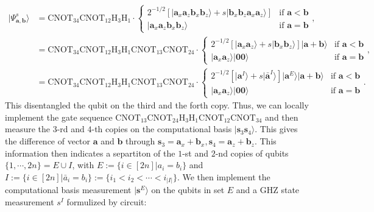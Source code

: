 \documentclass[aps,%
twocolumn,%
floatfix,%
pra,%
amsfonts,%
groupedaddress,%
superscriptaddress]{revtex4-2}%
\newcommand{\ket}[1]{\lvert #1\rangle}
\newcommand{\1}{\mathbbm{1}}
\begin{document}
\begin{align}
    \ket{\Psi^{s}_{\mathbf{a}, \mathbf{b}}}&= \mathrm{CNOT}_{34}\mathrm{CNOT}_{12}\mathrm{H}_3\mathrm{H}_1 \cdot
\begin{cases}
    2^{-1/2} \left[{\ket{\mathbf{a}_x \mathbf{a}_z\mathbf{b}_x\mathbf{b}_z} +s \ket{\mathbf{b}_x \mathbf{b}_z\mathbf{a}_x\mathbf{a}_z}}\right] &\text{if~} \mathbf{a} < \mathbf{b}\\
    \ket{\mathbf{a}_x \mathbf{a}_z\mathbf{b}_x\mathbf{b}_z}&\text{if~} \mathbf{a} = \mathbf{b}
\end{cases},\\
&= \mathrm{CNOT}_{34}\mathrm{CNOT}_{12}\mathrm{H}_3\mathrm{H}_1 \mathrm{CNOT}_{13}\mathrm{CNOT}_{24}\cdot
\begin{cases}
    2^{-1/2} \left[{\ket{\mathbf{a}_x \mathbf{a}_z} +s \ket{\mathbf{b}_x \mathbf{b}_z}} \right]\ket{\mathbf{a} + \mathbf{b}} &\text{if~} \mathbf{a} < \mathbf{b}\\
    \ket{\mathbf{a}_x \mathbf{a}_z} \ket{\mathbf{0} \mathbf{0}}&\text{if~} \mathbf{a} = \mathbf{b}
\end{cases},\\
&= \mathrm{CNOT}_{34}\mathrm{CNOT}_{12}\mathrm{H}_3\mathrm{H}_1 \mathrm{CNOT}_{13}\mathrm{CNOT}_{24}\cdot
\begin{cases}
    2^{-1/2} \left[{\ket{\mathbf{a}^{I}} +s \ket{\bar{\mathbf{a}}^{I}}}\right] \ket{\mathbf{a}^{E}}\ket{\mathbf{a} + \mathbf{b}} &\text{if~} \mathbf{a} < \mathbf{b}\\
    \ket{\mathbf{a}_x \mathbf{a}_z} \ket{\mathbf{0} \mathbf{0}}&\text{if~} \mathbf{a} = \mathbf{b}
\end{cases}.
\end{align}
This disentangled the qubit on the third and the forth copy. Thus, we can locally implement the gate sequence $ \mathrm{CNOT}_{13}\mathrm{CNOT}_{24}\mathrm{H}_3\mathrm{H}_1\mathrm{CNOT}_{12}\mathrm{CNOT}_{34}$ and then measure the $3$-rd and $4$-th copies on the computational basis $\ket{\mathbf{s}_{3}\mathbf{s}_4}$. This gives the difference of vector $\mathbf{a}$ and $\mathbf{b}$ through $\mathbf{s}_{3} = \mathbf{a}_x + \mathbf{b}_x,\mathbf{s}_{4} = \mathbf{a}_z + \mathbf{b}_z$. 
This information then indicates a separtiton of the $1$-st and $2$-nd copies of qubits $\{1,\cdots,2n\} = E \cup I$, with $E := \{i \in [2n]| a_i = b_i\} $ and $I:= \{i \in [2n]| \bar{a}_i = b_i\} := \{i_1<i_2<\cdots<i_{|I|}\}$. 
We then implement the computational basis measurement $\ket{\mathbf{s}^{E}}$ on the qubits in set $E$ and a GHZ state measurement $s^{I}$ formulized by circuit:
\end{document}
